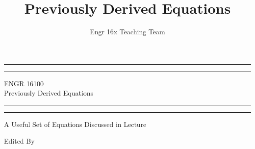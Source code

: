 \documentclass{article}
\title{Previously Derived Equations}
\author{Engr 16x Teaching Team}
\begin{document}
\begin{titlepage} %
    
    \centering %
    
    \scshape %
    
    \vspace*{\baselineskip} %
    
    
    \rule{\textwidth}{1.6pt}\vspace*{-\baselineskip}\vspace*{2pt} %
    \rule{\textwidth}{0.4pt} %
    
    \vspace{0.75\baselineskip} %
    
    {\LARGE ENGR 16100\\ Previously Derived Equations\\} %
    
    \vspace{0.75\baselineskip} %
    
    \rule{\textwidth}{0.4pt}\vspace*{-\baselineskip}\vspace{3.2pt} %
    \rule{\textwidth}{1.6pt} %
    
    \vspace{2\baselineskip} %
    
    
    A Useful Set of Equations Discussed in Lecture  %
    
    \vspace*{3\baselineskip} %
    
    
    Edited By
    

\end{titlepage}
\end{document}
